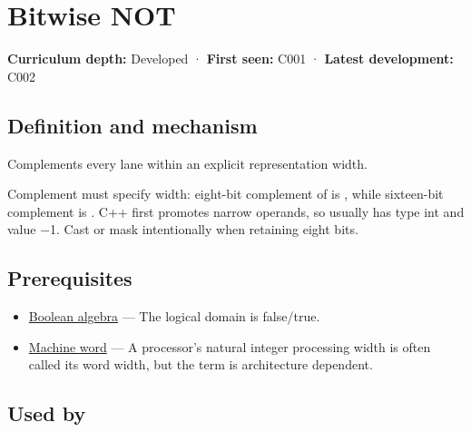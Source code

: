 \hypertarget{appendix-8f38927cfc54}{}\label{referencestart:appendix-8f38927cfc54}
\section{Bitwise NOT}\label{appendix-8f38927cfc54-bitwise-not}

\hypertarget{appendix-8f38927cfc54-bitwise-not}{}

\textbf{Curriculum depth:} Developed · \textbf{First seen:} C001 · \textbf{Latest development:} C002

\begin{allmightroledefinition}

\subsection{Definition and mechanism}\label{appendix-8f38927cfc54-definition-and-mechanism}

\hypertarget{appendix-8f38927cfc54-definition-and-mechanism}{}

Complements every lane within an explicit representation width.

\end{allmightroledefinition}

Complement must specify width: eight-bit complement of  is , while sixteen-bit complement is . C++ first promotes narrow operands, so  usually has type int and value −1. Cast or mask intentionally when retaining eight bits.

\subsection{Prerequisites}\label{appendix-8f38927cfc54-prerequisites}

\hypertarget{appendix-8f38927cfc54-prerequisites}{}

\begin{itemize}
\tightlist
\item
  \hyperref[appendix-24475e1596a8]{Boolean algebra} --- The logical domain is false/true.
\item
  \hyperref[appendix-d67a19507dc5]{Machine word} --- A processor's natural integer processing width is often called its word width, but the term is architecture dependent.
\end{itemize}

\subsection{Used by}\label{appendix-8f38927cfc54-used-by}

